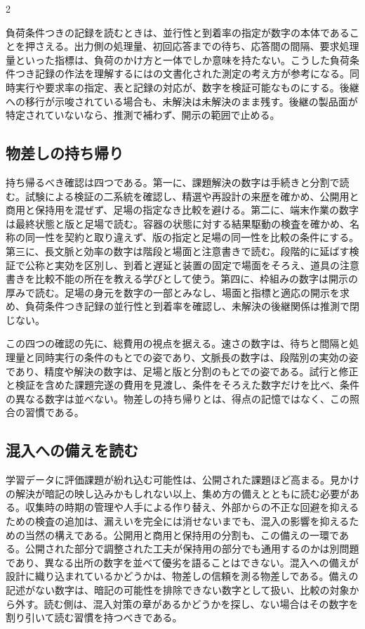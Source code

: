 \documentclass[lualatex,a4paper,10pt]{jlreq}
\begin{document}
\begin{multicols}{2}
\begin{technicalnote}[枠組みの開示を読む]
負荷条件つきの記録を読むときは、並行性と到着率の指定が数字の本体であることを押さえる。出力側の処理量、初回応答までの待ち、応答間の間隔、要求処理量といった指標は、負荷のかけ方と一体でしか意味を持たない。こうした負荷条件つき記録の作法を理解するには\autocite{genaiperf}の文書化された測定の考え方が参考になる。同時実行や要求率の指定、表と記録の対応が、数字を検証可能なものにする。後継への移行が示唆されている場合も、未解決は未解決のまま残す。後継の製品面が特定されていないなら、推測で補わず、開示の範囲で止める。
\end{technicalnote}

\subsection{物差しの持ち帰り}
持ち帰るべき確認は四つである。第一に、課題解決の数字は手続きと分割で読む。試験による検証の二系統を確認し、精選や再設計の来歴を確かめ、公開用と商用と保持用を混ぜず、足場の指定なき比較を避ける。第二に、端末作業の数字は最終状態と版と足場で読む。容器の状態に対する結果駆動の検査を確かめ、名称の同一性を契約と取り違えず、版の指定と足場の同一性を比較の条件にする。第三に、長文脈と効率の数字は階段と場面と注意書きで読む。段階的に延ばす検証で公称と実効を区別し、到着と遅延と装置の固定で場面をそろえ、道具の注意書きを比較不能の所在を教える学びとして使う。第四に、枠組みの数字は開示の厚みで読む。足場の身元を数字の一部とみなし、場面と指標と適応の開示を求め、負荷条件つき記録の並行性と到着率を確認し、未解決の後継関係は推測で閉じない。

この四つの確認の先に、総費用の視点を据える。速さの数字は、待ちと間隔と処理量と同時実行の条件のもとでの姿であり、文脈長の数字は、段階別の実効の姿であり、精度や解決の数字は、足場と版と分割のもとでの姿である。試行と修正と検証を含めた課題完遂の費用を見渡し、条件をそろえた数字だけを比べ、条件の異なる数字は並べない。物差しの持ち帰りとは、得点の記憶ではなく、この照合の習慣である。

\subsection{混入への備えを読む}
学習データに評価課題が紛れ込む可能性は、公開された課題ほど高まる。見かけの解決が暗記の映し込みかもしれない以上、集め方の備えとともに読む必要がある。収集時の時期の管理や人手による作り替え、外部からの不正な回避を抑えるための検査の追加は、漏えいを完全には消せないまでも、混入の影響を抑えるための当然の構えである\autocite{swepro}。公開用と商用と保持用の分割も、この備えの一環である。公開された部分で調整された工夫が保持用の部分でも通用するのかは別問題であり、異なる出所の数字を並べて優劣を語ることはできない。混入への備えが設計に織り込まれているかどうかは、物差しの信頼を測る物差しである。備えの記述がない数字は、暗記の可能性を排除できない数字として扱い、比較の対象から外す。読む側は、混入対策の章があるかどうかを探し、ない場合はその数字を割り引いて読む習慣を持つべきである。

\end{multicols}
\end{document}
